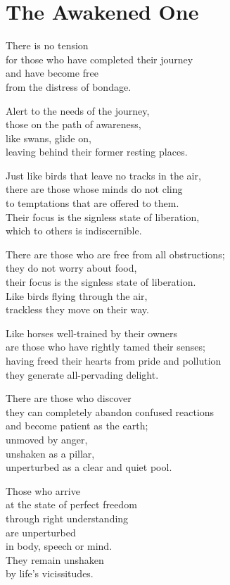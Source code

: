 
\chapter{The Awakened One}


There is no tension\\
for those who have completed their journey\\
and have become free\\
from the distress of bondage.


Alert to the needs of the journey,\\
those on the path of awareness,\\
like swans, glide on,\\
leaving behind their former resting places.


Just like birds that leave no tracks in the air,\\
there are those whose minds do not cling\\
to temptations that are offered to them.\\
Their focus is the signless state of liberation,\\
which to others is indiscernible.


There are those who are free from all obstructions;\\
they do not worry about food,\\
their focus is the signless state of liberation.\\
Like birds flying through the air,\\
trackless they move on their way.


Like horses well-trained by their owners\\
are those who have rightly tamed their senses;\\
having freed their hearts from pride and pollution\\
they generate all-pervading delight.


There are those who discover\\
they can completely abandon confused reactions\\
and become patient as the earth;\\
unmoved by anger,\\
unshaken as a pillar,\\
unperturbed as a clear and quiet pool.


Those who arrive\\
at the state of perfect freedom\\
through right understanding\\
are unperturbed\\
in body, speech or mind.\\
They remain unshaken\\
by life's vicissitudes.


